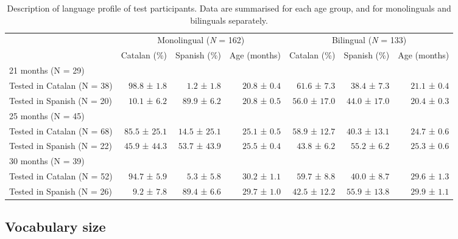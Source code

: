 \documentclass[
  letterpaper,
  DIV=11,
  numbers=noendperiod]{scrartcl}
\newenvironment{Shaded}{\begin{snugshade}}{\end{snugshade}}
\newcommand{\DecValTok}[1]{\textcolor[rgb]{0.68,0.00,0.00}{#1}}
\newcommand{\FunctionTok}[1]{\textcolor[rgb]{0.28,0.35,0.67}{#1}}
\newcommand{\NormalTok}[1]{\textcolor[rgb]{0.00,0.23,0.31}{#1}}
\newcommand{\OtherTok}[1]{\textcolor[rgb]{0.00,0.23,0.31}{#1}}
\newcommand{\SpecialCharTok}[1]{\textcolor[rgb]{0.37,0.37,0.37}{#1}}
\begin{document}
\hypertarget{tbl-participants-lp}{}
\begin{longtable}{l|rrrrrr}
\caption{\label{tbl-participants-lp}Description of language profile of test participants. Data are
summarised for each age group, and for monolinguals and bilinguals
separately. }\tabularnewline

\toprule
\multicolumn{1}{l}{} & \multicolumn{3}{c}{Monolingual (\emph{N} = 162)} & \multicolumn{3}{c}{Bilingual (\emph{N} = 133)} \\ 
\cmidrule(lr){2-4} \cmidrule(lr){5-7}
\multicolumn{1}{l}{} & Catalan (\%) & Spanish (\%) & Age (months) & Catalan (\%) & Spanish (\%) & Age (months) \\ 
\midrule
\multicolumn{7}{l}{21 months (N = 29)} \\ 
\midrule
Tested in Catalan (N = 38) & $98.8$ ± $1.8$ & $1.2$ ± $1.8$ & $20.8$ ± $0.4$ & $61.6$ ± $7.3$ & $38.4$ ± $7.3$ & $21.1$ ± $0.4$ \\ 
Tested in Spanish (N = 20) & $10.1$ ± $6.2$ & $89.9$ ± $6.2$ & $20.8$ ± $0.5$ & $56.0$ ± $17.0$ & $44.0$ ± $17.0$ & $20.4$ ± $0.3$ \\ 
\midrule
\multicolumn{7}{l}{25 months (N = 45)} \\ 
\midrule
Tested in Catalan (N = 68) & $85.5$ ± $25.1$ & $14.5$ ± $25.1$ & $25.1$ ± $0.5$ & $58.9$ ± $12.7$ & $40.3$ ± $13.1$ & $24.7$ ± $0.6$ \\ 
Tested in Spanish (N = 22) & $45.9$ ± $44.3$ & $53.7$ ± $43.9$ & $25.5$ ± $0.4$ & $43.8$ ± $6.2$ & $55.2$ ± $6.2$ & $25.3$ ± $0.6$ \\ 
\midrule
\multicolumn{7}{l}{30 months (N = 39)} \\ 
\midrule
Tested in Catalan (N = 52) & $94.7$ ± $5.9$ & $5.3$ ± $5.8$ & $30.2$ ± $1.1$ & $59.7$ ± $8.8$ & $40.0$ ± $8.7$ & $29.6$ ± $1.3$ \\ 
Tested in Spanish (N = 26) & $9.2$ ± $7.8$ & $89.4$ ± $6.6$ & $29.7$ ± $1.0$ & $42.5$ ± $12.2$ & $55.9$ ± $13.8$ & $29.9$ ± $1.1$ \\ 
\bottomrule
\end{longtable}

\hypertarget{vocabulary-size}{%
\subsection{Vocabulary size}\label{vocabulary-size}}

\begin{Shaded}
\end{Shaded}
\end{document}
